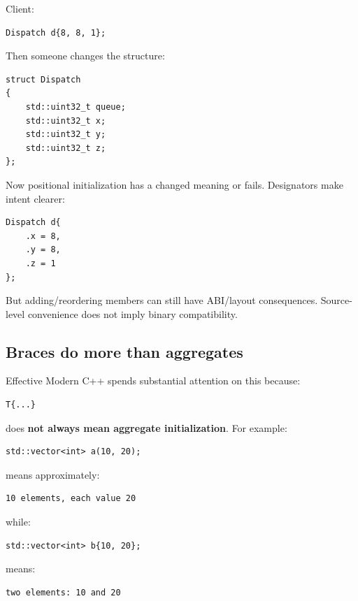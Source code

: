 Client:

\begin{verbatim}
Dispatch d{8, 8, 1};
\end{verbatim}

Then someone changes the structure:

\begin{verbatim}
struct Dispatch
{
    std::uint32_t queue;
    std::uint32_t x;
    std::uint32_t y;
    std::uint32_t z;
};
\end{verbatim}

Now positional initialization has a changed meaning or fails. Designators make intent clearer:

\begin{verbatim}
Dispatch d{
    .x = 8,
    .y = 8,
    .z = 1
};
\end{verbatim}

But adding/reordering members can still have ABI/layout consequences. Source-level convenience does not imply binary compatibility.

\subsection{Braces do more than aggregates}\label{01-foundations-i-ch003-braces-do-more-than-aggregates}

\hypertarget{01-foundations-i-ch003-braces-do-more-than-aggregates}{}

Effective Modern C++ spends substantial attention on this because:

\begin{verbatim}
T{...}
\end{verbatim}

does \textbf{not always mean aggregate initialization}. For example:

\begin{verbatim}
std::vector<int> a(10, 20);
\end{verbatim}

means approximately:

\begin{verbatim}
10 elements, each value 20
\end{verbatim}

while:

\begin{verbatim}
std::vector<int> b{10, 20};
\end{verbatim}

means:

\begin{verbatim}
two elements: 10 and 20
\end{verbatim}

